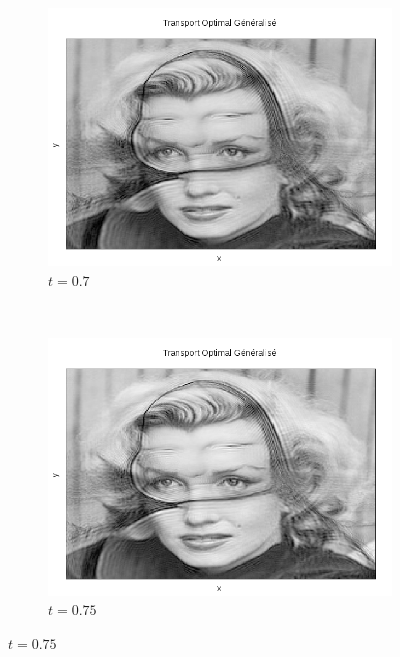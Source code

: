 \documentclass[a4paper,12pt]{article}
\begin{document}
\begin{figure}[!h]
\begin{subfigure}[b]{0.23\linewidth}
\includegraphics[width=\linewidth]{img/2DMorphing/T_00155.png}
\caption*{$t=0.7$}
\end{subfigure}
~
\begin{subfigure}[b]{0.23\linewidth}
\includegraphics[width=\linewidth]{img/2DMorphing/T_00166.png}
\caption*{$t=0.75$}
\end{subfigure}


\end{figure}
\end{document}
